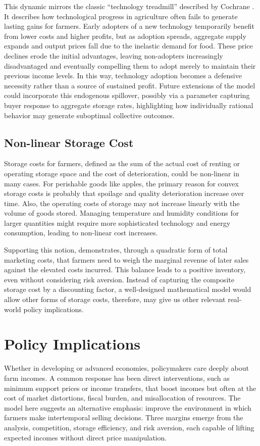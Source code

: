 This dynamic mirrors the classic ``technology treadmill'' described by Cochrane \citep{cochrane1958farm, levins1996treadmill}. It describes how technological progress in agriculture often fails to generate lasting gains for farmers. Early adopters of a new technology temporarily benefit from lower costs and higher profits, but as adoption spreads, aggregate supply expands and output prices fall due to the inelastic demand for food. These price declines erode the initial advantages, leaving non-adopters increasingly disadvantaged and eventually compelling them to adopt merely to maintain their previous income levels. In this way, technology adoption becomes a defensive necessity rather than a source of sustained profit. Future extensions of the model could incorporate this endogenous spillover, possibly via a parameter capturing buyer response to aggregate storage rates, highlighting how individually rational behavior may generate suboptimal collective outcomes.






\subsection{Non-linear Storage Cost}
\noindent Storage costs for farmers, defined as the sum of the actual cost of renting or operating storage space and the cost of deterioration, could be non-linear in many cases. For perishable goods like apples, the primary reason for convex storage costs is probably that spoilage and quality deterioration increase over time. Also, the operating costs of storage may not increase linearly with the volume of goods stored. Managing temperature and humidity conditions for larger quantities might require more sophisticated technology and energy consumption, leading to non-linear cost increases.

Supporting this notion, \cite{williams1989economic} demonstrates, through a quadratic form of total marketing costs, that farmers need to weigh the marginal revenue of later sales against the elevated costs incurred. This balance leads to a positive inventory, even without considering risk aversion. Instead of capturing the composite storage cost by a discounting factor, a well-designed mathematical model would allow other forms of storage costs, therefore, may give us other relevant real-world policy implications.


\section{Policy Implications}
\noindent
Whether in developing or advanced economies, policymakers care deeply about farm incomes. A common response has been direct interventions, such as minimum support prices or income transfers, that boost incomes but often at the cost of market distortions, fiscal burden, and misallocation of resources. The model here suggests an alternative emphasis: improve the environment in which farmers make intertemporal selling decisions. Three margins emerge from the analysis, competition, storage efficiency, and risk aversion, each capable of lifting expected incomes without direct price manipulation.



